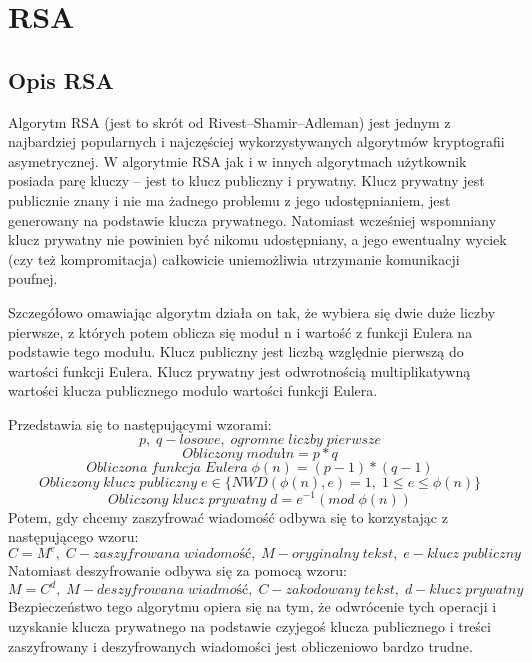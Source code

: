 \section{RSA}
\subsection{Opis RSA}
Algorytm RSA (jest to skrót od Rivest–Shamir–Adleman) jest jednym z najbardziej popularnych i najczęściej wykorzystywanych algorytmów kryptografii asymetrycznej. W algorytmie RSA jak i w innych algorytmach użytkownik posiada parę kluczy – jest to klucz publiczny i prywatny. Klucz prywatny jest publicznie znany i nie ma żadnego problemu z jego udostępnianiem, jest generowany na podstawie klucza prywatnego. Natomiast wcześniej wspomniany klucz prywatny nie powinien być nikomu udostępniany, a jego ewentualny wyciek (czy też kompromitacja) całkowicie uniemożliwia utrzymanie komunikacji poufnej.

\vspace{1em}

Szczegółowo omawiając algorytm działa on tak, że wybiera się dwie duże liczby pierwsze, z których potem oblicza się moduł n i wartość z funkcji Eulera na podstawie tego modułu. Klucz publiczny jest liczbą względnie pierwszą do wartości funkcji Eulera. Klucz prywatny jest odwrotnością multiplikatywną wartości klucza publicznego modulo wartości funkcji Eulera.

\vspace{1em}

Przedstawia się to następującymi wzorami:
\begin{equation}
    p, \; q-losowe, \; ogromne \; liczby \; pierwsze
\end{equation}
\begin{equation}
    Obliczony \; moduł n=p*q
\end{equation}
\begin{equation}
    Obliczona \; funkcja \; Eulera \; \phi(n)=(p-1)*(q-1)
\end{equation}
\begin{equation}
    Obliczony \; klucz \; publiczny \; e \in \{NWD(\phi(n),e)=1, \; 1 \leqslant e \leqslant \phi(n)\}
\end{equation}
\begin{equation}
    Obliczony \; klucz \; prywatny \; d= e^{-1} (mod \; \phi(n))
\end{equation}
Potem, gdy chcemy zaszyfrować wiadomość odbywa się to korzystając z następującego wzoru:
\begin{equation}
    C= M^e, \; C-zaszyfrowana \;  wiadomość, \; M-oryginalny \; tekst, \; e-klucz \; publiczny
\end{equation}
Natomiast deszyfrowanie odbywa się za pomocą wzoru:
\begin{equation}
    M= C^d, \; M-deszyfrowana \; wiadmość, \;C-zakodowany \; tekst, \; d-klucz \; prywatny
\end{equation}
Bezpieczeństwo tego algorytmu opiera się na tym, że odwrócenie tych operacji i uzyskanie klucza prywatnego na podstawie czyjegoś klucza publicznego i treści zaszyfrowany i deszyfrowanych wiadomości jest obliczeniowo bardzo trudne.

